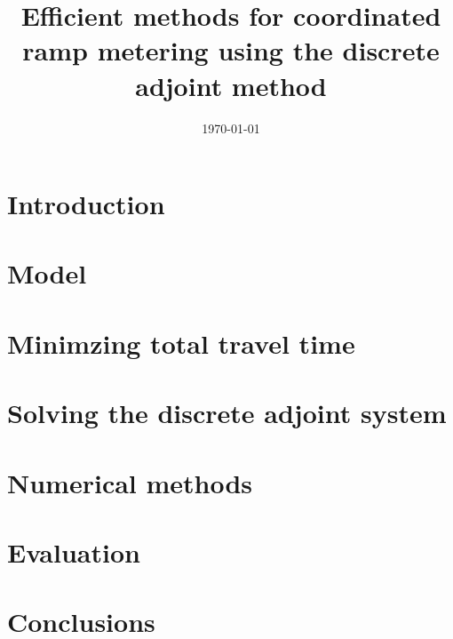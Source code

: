 \documentclass{article}
\begin{document}
\title{Efficient methods for coordinated ramp metering using the discrete adjoint method}


\date{\today}

\maketitle

\begin{abstract}

\end{abstract}



\section{Introduction}\label{sec:introduction}


\section{Model} %
\label{sec:model}



\section{Minimzing total travel time} %
\label{sec:minimzing_total_travel_time}


\section{Solving the discrete adjoint system} %
\label{sec:solving_the_discrete_adjoint_system}



\section{Numerical methods} %
\label{sec:numerical_methods}



\section{Evaluation}\label{sec:evaluation}


\section{Conclusions}\label{sec:conclusions}






\end{document}
